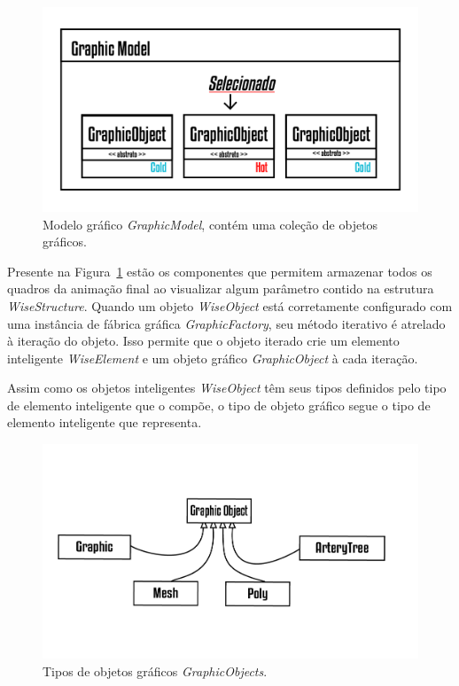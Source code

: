 \documentclass[
        english,			
        brazil			        %
        ,<...>]{abntbibufjf}
\begin{document}
\begin{figure}[!htbp]
	\centering
	\includegraphics[scale=1]{Figures/GraphicModel.png}
	\caption{Modelo gráfico \textit{GraphicModel}, contém uma coleção de objetos gráficos.}
	\label{fig7:graphicmodel}
\end{figure}

Presente na Figura~\ref{fig7:graphicmodel} estão os componentes que permitem armazenar todos os quadros da animação final ao visualizar algum parâmetro contido na estrutura \textit{WiseStructure}. Quando um objeto \textit{WiseObject} está corretamente configurado com uma instância de fábrica gráfica \textit{GraphicFactory}, seu método iterativo é atrelado à iteração do objeto. Isso permite que o objeto iterado crie um elemento inteligente \textit{WiseElement} e um objeto gráfico \textit{GraphicObject} à cada iteração.

Assim como os objetos inteligentes \textit{WiseObject} têm seus tipos definidos pelo tipo de elemento inteligente que o compõe, o tipo de objeto gráfico segue o tipo de elemento inteligente que representa.

\begin{figure}[!htbp]
	\centering
	\includegraphics[scale=1]{Figures/GraphicObjects}
	\caption{Tipos de objetos gráficos \textit{GraphicObjects}.}
	\label{fig7:graphicobjects}
\end{figure}
\end{document}
